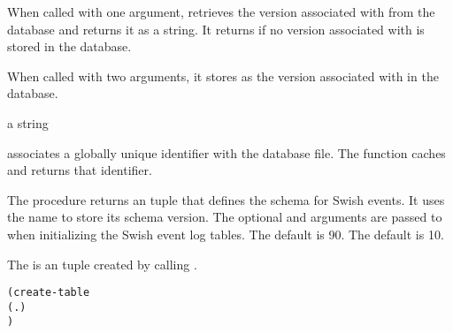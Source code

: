 \begin{argtbl}
\end{argtbl}

When called with one argument,  retrieves the
version associated with  from the database and returns it as
a string. It returns  if no version associated with
 is stored in the database.

When called with two arguments, it stores  as the version
associated with  in the database.

\begin{procedure}
\end{procedure}

\returns{} a string

 associates a globally unique identifier with the
database file. The  function caches and
returns that identifier.

\begin{property}
  \label{make-swish-event-logger}
\end{property}

The  procedure returns
an  tuple that defines the schema
for Swish events.
It uses the name  to store its schema version.
The optional  and  arguments are passed to
 when initializing the Swish event log
tables.
The default  is 90.
The default  is 10.

\begin{property}
\end{property}

The  is an  tuple
created by calling .


\begin{syntax}\begin{alltt}
(create-table 
  (  . )
  \etc{})\strut\end{alltt}
\end{syntax}
\expandsto{} 

